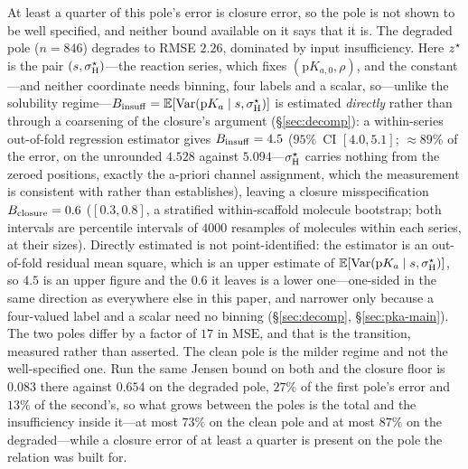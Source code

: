 At least a quarter of this pole's error is closure error, so the
pole is not shown to be well specified, and neither bound available on it says that it is.
The degraded pole ($n{=}846$)
degrades to RMSE $2.26$, dominated by input insufficiency. Here $z^\star$ is the pair
$(s,\sigma_{\mathrm H}^\star)$---the reaction series, which fixes $(\mathrm pK_{a,0},\rho)$, and the constant---and
neither coordinate needs binning, four labels and a scalar, so---unlike the solubility
regime---$B_{\mathrm{insuff}}=\mathbb{E}[\mathrm{Var}(\mathrm pK_a\mid s,\sigma_{\mathrm H}^\star)]$ is estimated \emph{directly} rather
than through a coarsening of the closure's argument (\S\ref{sec:decomp}): a within-series
out-of-fold regression estimator gives $B_{\mathrm{insuff}}=4.5$
($95\%$~CI $[4.0,5.1]$; $\approx89\%$ of the error, on the unrounded $4.528$ against
$5.094$---$\sigma_{\mathrm H}^\star$ carries nothing from
the zeroed positions, exactly the a-priori channel assignment, which the measurement is consistent
with rather than establishes), leaving a closure misspecification
$B_{\mathrm{closure}}=0.6$ ($[0.3,0.8]$, a stratified within-scaffold molecule bootstrap; both intervals are
percentile intervals of $4000$ resamples of molecules within each series, at their sizes). Directly estimated is
not point-identified: the estimator is an out-of-fold residual mean square, which is an upper
estimate of $\mathbb{E}[\mathrm{Var}(\mathrm{p}K_a\mid s,\sigma_{\mathrm H}^\star)]$, so $4.5$ is an upper figure and the $0.6$ it
leaves is a lower one---one-sided in the same direction as everywhere else in this paper, and
narrower only because a four-valued label and a scalar need no binning (\S\ref{sec:decomp},
\S\ref{sec:pka-main}). The two poles differ by a factor of $17$ in $\mathrm{MSE}$, and that is the
transition, measured rather than asserted. The clean pole is the milder regime and not the
well-specified one. Run the same Jensen bound on both and the closure floor is $0.083$ there against
$0.654$ on the degraded pole, $27\%$ of the first pole's error and $13\%$ of the second's, so what
grows between the poles is the total and the insufficiency inside it---at most $73\%$ on the clean
pole and at most $87\%$ on the degraded---while a closure error of at least a quarter is present on
the pole the relation was built for.

